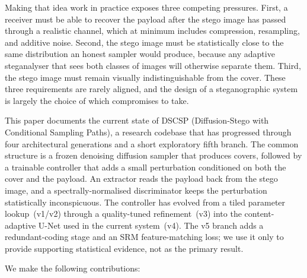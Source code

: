 \documentclass[journal]{IEEEtran}
\begin{document}
Making that idea work in practice exposes three competing pressures.
First, a receiver must be able to recover the payload after the
stego image has passed through a realistic channel, which at minimum
includes compression, resampling, and additive noise. Second, the
stego image must be statistically close to the same distribution an
honest sampler would produce, because any adaptive steganalyser that
sees both classes of images will otherwise separate them. Third, the
stego image must remain visually indistinguishable from the cover.
These three requirements are rarely aligned, and the design of a
steganographic system is largely the choice of which compromises to
take.

This paper documents the current state of DSCSP (Diffusion-Stego with
Conditional Sampling Paths), a research codebase that has progressed
through four architectural generations and a short exploratory fifth
branch. The common structure is a frozen denoising diffusion sampler
that produces covers, followed by a trainable controller that adds a
small perturbation conditioned on both the cover and the payload. An
extractor reads the payload back from the stego image, and a
spectrally-normalised discriminator keeps the perturbation
statistically inconspicuous. The controller has evolved from a tiled
parameter lookup~(v1/v2) through a quality-tuned refinement~(v3) into
the content-adaptive U-Net used in the current system~(v4). The v5
branch adds a redundant-coding stage and an SRM feature-matching loss;
we use it only to provide supporting statistical evidence, not as the
primary result.

We make the following contributions:
\end{document}
